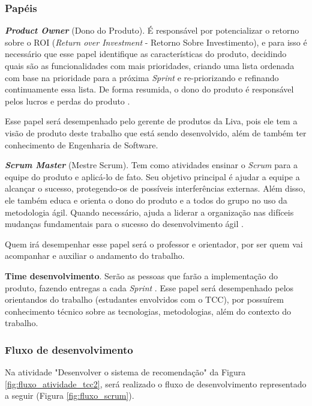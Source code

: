 \subsubsection{Papéis}

\textbf{\textit{Product Owner}} (Dono do Produto). É responsável por potencializar o retorno sobre o ROI (\textit{Return over Investment} - Retorno Sobre Investimento), e para isso é necessário que esse papel identifique as características do produto, decidindo quais são as funcionalidades com mais prioridades, criando uma lista ordenada com base na prioridade para a próxima \textit{Sprint} e re-priorizando e refinando continuamente essa lista. De forma resumida, o dono do produto é responsável pelos lucros e perdas do produto \cite{Sutherland}.

Esse papel será desempenhado pelo gerente de produtos da Liva, pois ele tem a visão de produto deste trabalho que está sendo desenvolvido, além de também ter conhecimento de Engenharia de Software.

\textbf{\textit{Scrum Master}} (Mestre Scrum). Tem como atividades ensinar o \textit{Scrum} para a equipe do produto e aplicá-lo de fato. Seu objetivo principal é ajudar a equipe a alcançar o sucesso, protegendo-os de possíveis interferências externas. Além disso, ele também educa e  orienta o dono do produto e a todos do grupo no uso da metodologia ágil. Quando necessário, ajuda a liderar a organização nas difíceis mudanças fundamentais para o sucesso do desenvolvimento ágil \cite{Sutherland}.

Quem irá desempenhar esse papel será o professor e orientador, por ser quem vai acompanhar e auxiliar o andamento do trabalho.

\textbf{Time desenvolvimento}. Serão as pessoas que farão a implementação do produto, fazendo entregas a cada \textit{Sprint} \cite{Sutherland}. Esse papel será desempenhado pelos orientandos do trabalho (estudantes envolvidos com o TCC), por possuírem conhecimento técnico sobre as tecnologias, metodologias, além do contexto do trabalho.

\subsubsection{Fluxo de desenvolvimento}

Na atividade "Desenvolver o sistema de recomendação" da Figura \ref{fig:fluxo_atividade_tcc2}, será realizado o fluxo de desenvolvimento representado a seguir (Figura \ref{fig:fluxo_scrum}).

